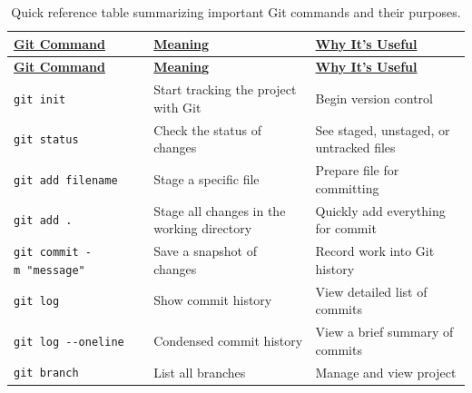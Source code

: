 \documentclass[
  11pt,
  a4paper,
]{article}
\begin{document}
\begin{longtable}[]{@{}
  >{\raggedright\arraybackslash}p{}
  >{\raggedright\arraybackslash}p{}
  >{\raggedright\arraybackslash}p{}@{}}
\caption{Quick reference table summarizing important Git commands and
their purposes.}\tabularnewline
\toprule\noalign{}
\begin{minipage}[b]{\linewidth}\raggedright
\ul{\textbf{Git Command}}
\end{minipage} & \begin{minipage}[b]{\linewidth}\raggedright
\ul{\textbf{Meaning}}
\end{minipage} & \begin{minipage}[b]{\linewidth}\raggedright
\ul{\textbf{Why It's Useful}}
\end{minipage} \\
\midrule\noalign{}
\endfirsthead
\toprule\noalign{}
\begin{minipage}[b]{\linewidth}\raggedright
\ul{\textbf{Git Command}}
\end{minipage} & \begin{minipage}[b]{\linewidth}\raggedright
\ul{\textbf{Meaning}}
\end{minipage} & \begin{minipage}[b]{\linewidth}\raggedright
\ul{\textbf{Why It's Useful}}
\end{minipage} \\
\midrule\noalign{}
\endhead
\bottomrule\noalign{}
\endlastfoot
\texttt{git\ init} & Start tracking the project with Git & Begin version
control \\
\texttt{git\ status} & Check the status of changes & See staged,
unstaged, or untracked files \\
\texttt{git\ add\ filename} & Stage a specific file & Prepare file for
committing \\
\texttt{git\ add\ .} & Stage all changes in the working directory &
Quickly add everything for commit \\
\texttt{git\ commit\ -m\ "message"} & Save a snapshot of changes &
Record work into Git history \\
\texttt{git\ log} & Show commit history & View detailed list of
commits \\
\texttt{git\ log\ -\/-oneline} & Condensed commit history & View a brief
summary of commits \\
\texttt{git\ branch} & List all branches & Manage and view project

\end{longtable}
\end{document}
